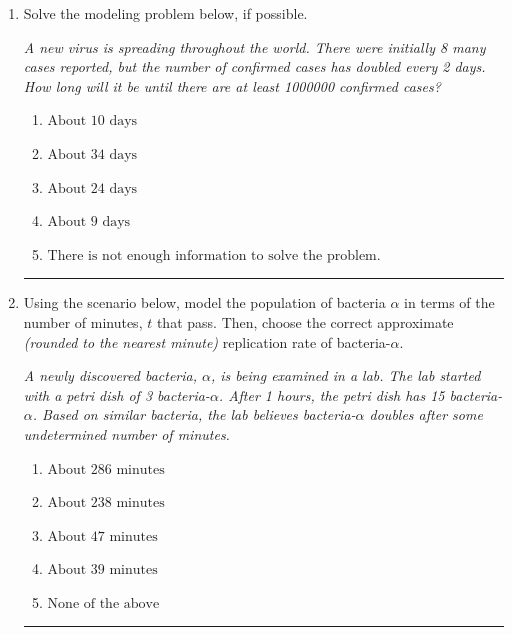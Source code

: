 \documentclass[14pt]{extbook}
\newcommand{\litem}[1]{\item#1\hspace*{-1cm}\rule{\textwidth}{0.4pt}}
\begin{document}
\begin{enumerate}
{\begin{enumerate}[label=\Alph*.]
\end{enumerate} }
\litem{
Solve the modeling problem below, if possible.
\begin{center}
    \textit{ A new virus is spreading throughout the world. There were initially 8 many cases reported, but the number of confirmed cases has doubled every 2 days. How long will it be until there are at least 1000000 confirmed cases? }
\end{center}
\begin{enumerate}[label=\Alph*.]
\item \( \text{About } 10 \text{ days} \)
\item \( \text{About } 34 \text{ days} \)
\item \( \text{About } 24 \text{ days} \)
\item \( \text{About } 9 \text{ days} \)
\item \( \text{There is not enough information to solve the problem.} \)

\end{enumerate} }
\litem{
Using the scenario below, model the population of bacteria $\alpha$ in terms of the number of minutes, $t$ that pass. Then, choose the correct approximate \textit{(rounded to the nearest minute)} replication rate of bacteria-$\alpha$.
\begin{center}
    \textit{ A newly discovered bacteria, $\alpha$, is being examined in a lab. The lab started with a petri dish of 3 bacteria-$\alpha$. After 1 hours, the petri dish has 15 bacteria-$\alpha$. Based on similar bacteria, the lab believes bacteria-$\alpha$ doubles after some undetermined number of minutes. }
\end{center}
\begin{enumerate}[label=\Alph*.]
\item \( \text{About } 286 \text{ minutes} \)
\item \( \text{About } 238 \text{ minutes} \)
\item \( \text{About } 47 \text{ minutes} \)
\item \( \text{About } 39 \text{ minutes} \)
\item \( \text{None of the above} \)


\end{enumerate}}
\end{enumerate}
\end{document}
